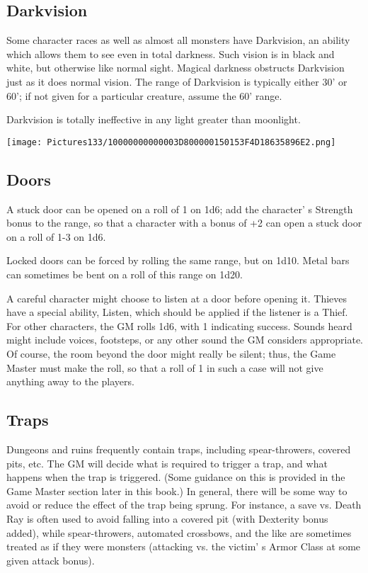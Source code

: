 \documentclass[a4paper,twoside,openany,10pt]{book}
\begin{document}
\begin{multicols}{2}
\subsection{Darkvision}\label{darkvision}

Some character races as well as almost all monsters have Darkvision, an ability which allows them to see even in total darkness. Such vision is in black and white, but otherwise like normal sight. Magical darkness obstructs Darkvision just as it does normal vision. The range of Darkvision is typically either 30' or 60'; if not given for a particular creature, assume the 60' range.

Darkvision is totally ineffective in any light greater than moonlight.


\begin{flushleft}
	\texttt{[image: Pictures133/10000000000003D800000150153F4D18635896E2.png]}
\end{flushleft}

\subsection{Doors}\label{doors}

A stuck door can be opened on a roll of 1 on 1d6; add the character' s Strength bonus to the range, so that a character with a bonus of +2 can open a stuck door on a roll of 1-3 on 1d6.

Locked doors can be forced by rolling the same range, but on 1d10. Metal bars can sometimes be bent on a roll of this range on 1d20.

A careful character might choose to listen at a door before opening it. Thieves have a special ability, Listen, which should be applied if the listener is a Thief. For other characters, the GM rolls 1d6, with 1 indicating success. Sounds heard might include voices, footsteps, or any other sound the GM considers appropriate. Of course, the room beyond the door might really be silent; thus, the Game Master must make the roll, so that a roll of 1 in such a case will not give anything away to the players.

\subsection{Traps}\label{traps}

Dungeons and ruins frequently contain traps, including spear-throwers, covered pits, etc. The GM will decide what is required to trigger a trap, and what happens when the trap is triggered. (Some guidance on this is provided in the Game Master section later in this book.) In general, there will be some way to avoid or reduce the effect of the trap being sprung. For instance, a save vs. Death Ray is often used to avoid falling into a covered pit (with Dexterity bonus added), while spear-throwers, automated crossbows, and the like are sometimes treated as if they were monsters (attacking vs. the victim' s Armor Class at some given attack bonus).


\end{multicols}
\end{document}
